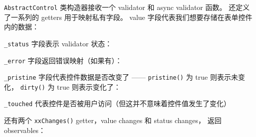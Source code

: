 


\texttt{AbstractControl} 类构造器接收一个 validator 和 async validator 函数。
还定义了一系列的 getters 用于映射私有字段。
value 字段代表我们想要存储在表单控件内的数据：




\texttt{\_status} 字段表示 validator 状态：




\texttt{\_error} 字段返回错误映射（如果有）：




\texttt{\_pristine} 字段代表控件数据是否改变了 —— \texttt{pristine()} 为 true 则表示未变化，
\texttt{dirty()} 为 true 则表示变化了：




\texttt{\_touched} 代表控件是否被用户访问（但这并不意味着控件值发生了变化）




还有两个 \texttt{xxChanges()} getter，value changes 和 status changes，
返回 observables：




